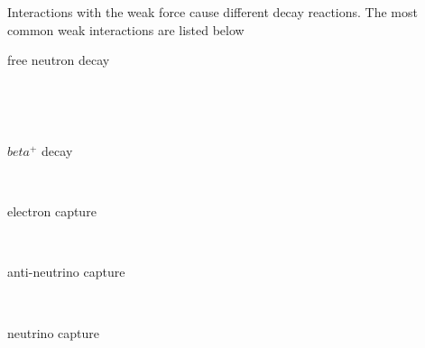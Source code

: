 Interactions with the weak force cause different decay reactions. The most common weak interactions are listed below
\iffalse
\begin{align*}
  \ce{^{A}_{Z}X_{N}} + \nu &\rightarrow \ce{^{A}_{Z-1}Y_{N+1} + e^{+}} %
\end{align*}
\fi
\begin{description}
  \item[free neutron decay]  \\%
  \item[\betadecay]  \\%
  \item[$beta^+$ decay]  \\%
  \item[electron capture]  \\%
  \item[anti-neutrino capture]  \\%
  \item[neutrino capture]  \\%
\end{description}

